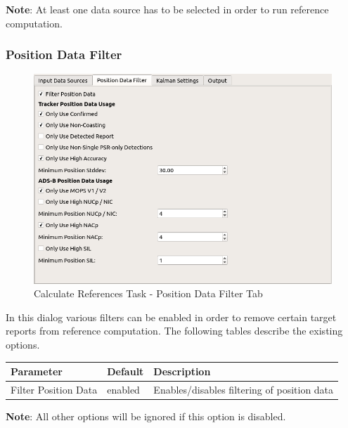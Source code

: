 \textbf{Note}: At least one data source has to be selected in order to run reference computation.

\subsubsection{Position Data Filter}

\begin{figure}[H]
    \center
      \includegraphics[frame,width=14cm]{figures/ui_task_references_tab_filter.png}
    \caption{Calculate References Task - Position Data Filter Tab}
\end{figure}

In this dialog various filters can be enabled in order to remove certain target reports from reference computation. 
The following tables describe the existing options.

\begin{table}[H]
    \center
    \begin{tabularx}{\textwidth}{ | l | l | X |}
        \hline
        \textbf{Parameter} & \textbf{Default} & \textbf{Description} \\ \hline
        Filter Position Data & enabled & Enables/disables filtering of position data \\ \hline
    \end{tabularx}
\end{table}

\textbf{Note}: All other options will be ignored if this option is disabled. \\

